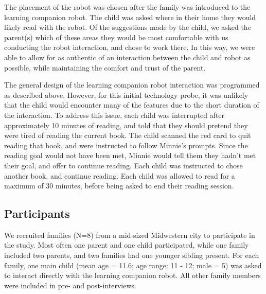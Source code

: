 \documentclass{sigchi}
\begin{document}
The placement of the robot was chosen after the family was introduced to the learning companion robot. The child was asked where in their home they would likely read with the robot. Of the suggestions made by the child, we asked the parent(s) which of these areas they would be most comfortable with us conducting the robot interaction, and chose to work there. In this way, we were able to allow for as authentic of an interaction between the child and robot as possible, while maintaining the comfort and trust of the parent. 

The general design of the learning companion robot interaction was programmed as described above. However, for this initial technology probe, it was unlikely that the child would encounter many of the features due to the short duration of the interaction. To address this issue, each child was interrupted after approximately 10 minutes of reading, and told that they should pretend they were tired of reading the current book. The child scanned the red card to quit reading that book, and were instructed to follow Minnie's prompts. Since the reading goal would not have been met, Minnie would tell them they hadn't met their goal, and offer to continue reading. Each child was instructed to chose another book, and continue reading. Each child was allowed to read for a maximum of 30 minutes, before being asked to end their reading session.


\subsection{Participants}
 We recruited families (N=8) from a mid-sized Midwestern city to participate in the study. Most often one parent and one child participated, while one family included two parents, and two families had one younger sibling present. For each family, one main child (mean age = 11.6; age range: 11 - 12; male = 5) was asked to interact directly with the learning companion robot. All other family members were included in pre- and post-interviews.
 
\end{document}

